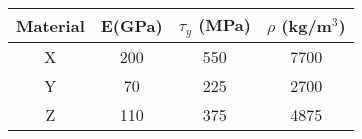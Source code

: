 \begin{table}[h!]
    \centering
    \begin{tabular}{| c | c | c | c |}
    \hline
        Material  &  E(GPa) & $\tau_y$ (MPa) & $\rho$ (kg/m$^3$)\\
    \hline
        X & 200 & 550 & 7700\\ 
    \hline
        Y & 70 & 225 & 2700\\ 
    \hline
        Z & 110 & 375 & 4875\\ 
    \hline
    \end{tabular}
    \label{tab:my_label}
\end{table}